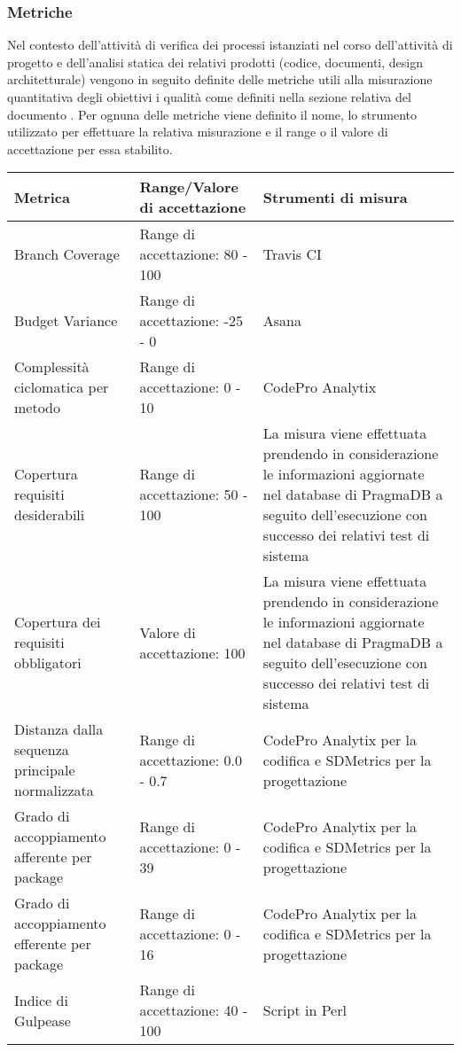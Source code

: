 \subsubsection{Metriche}
	Nel contesto dell'attività di verifica dei processi istanziati nel corso dell'attività di progetto e dell'analisi statica dei relativi prodotti (codice, documenti, design architetturale) vengono in seguito definite delle metriche utili alla misurazione quantitativa degli obiettivi i qualità come definiti nella sezione relativa del documento \PdQ .
	Per ognuna delle metriche viene definito il nome, lo strumento utilizzato per effettuare la relativa misurazione e il range o il valore di accettazione per essa stabilito.
			\normalsize
\begin{longtable}{|p{}|p{}|p{}|}
	\hline 
	\textbf{Metrica} & \textbf{Range/Valore di accettazione} & \textbf{Strumenti di misura} \\ 
	\hline
	\endhead 
	Branch Coverage & Range di accettazione: 80 - 100 &  Travis CI \\ 
	\hline 
	Budget Variance & Range di accettazione: -25 - 0 &  Asana \\ 
	\hline 
	Complessità ciclomatica per metodo & Range di accettazione: 0 - 10 &  CodePro Analytix \\ 
	\hline 
	Copertura requisiti desiderabili & Range di accettazione: 50 - 100 & La misura viene effettuata prendendo in considerazione le informazioni aggiornate nel database di PragmaDB a seguito dell'esecuzione con successo dei relativi test di sistema \\ 
	\hline 
	Copertura dei requisiti obbligatori & Valore di accettazione: 100 & La misura viene effettuata prendendo in considerazione le informazioni aggiornate nel database di PragmaDB a seguito dell'esecuzione con successo dei relativi test di sistema \\ 
	\hline 
	Distanza dalla sequenza principale normalizzata & Range di accettazione: 0.0 - 0.7 &  CodePro Analytix per la codifica e SDMetrics per la progettazione \\ 
	\hline 
	Grado di accoppiamento afferente per package & Range di accettazione: 0 - 39 &  CodePro Analytix per la codifica e SDMetrics per la progettazione \\ 
	\hline 
	Grado di accoppiamento efferente per package & Range di accettazione: 0 - 16 &  CodePro Analytix per la codifica e SDMetrics per la progettazione \\ 
	\hline 
	Indice di Gulpease & Range di accettazione: 40 - 100 & Script in Perl \\ 

\end{longtable}
